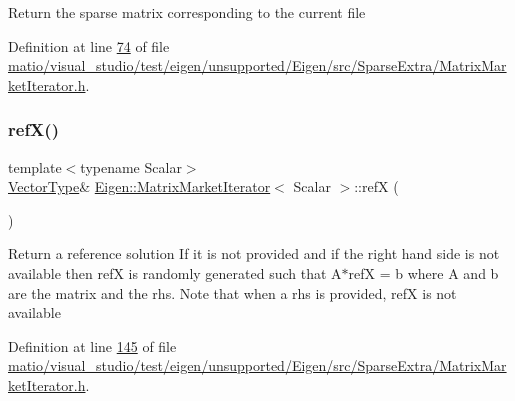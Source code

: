Return the sparse matrix corresponding to the current file 

Definition at line \hyperlink{matio_2visual__studio_2test_2eigen_2unsupported_2_eigen_2src_2_sparse_extra_2_matrix_market_iterator_8h_source_l00074}{74} of file \hyperlink{matio_2visual__studio_2test_2eigen_2unsupported_2_eigen_2src_2_sparse_extra_2_matrix_market_iterator_8h_source}{matio/visual\+\_\+studio/test/eigen/unsupported/\+Eigen/src/\+Sparse\+Extra/\+Matrix\+Market\+Iterator.\+h}.

\mbox{\label{class_eigen_1_1_matrix_market_iterator_a80f334d9fbbed0d24ba0c32d2bea16bc}} 
\subsubsection{\texorpdfstring{ref\+X()}{refX()}\hspace{0.1cm}{\footnotesize\ttfamily [1/2]}}
{\footnotesize\ttfamily template$<$typename Scalar$>$ \\
\hyperlink{group___core___module}{Vector\+Type}\& \hyperlink{class_eigen_1_1_matrix_market_iterator}{Eigen\+::\+Matrix\+Market\+Iterator}$<$ Scalar $>$\+::refX (\begin{DoxyParamCaption}{ }\end{DoxyParamCaption})\hspace{0.3cm}{\ttfamily [inline]}}

Return a reference solution If it is not provided and if the right hand side is not available then refX is randomly generated such that A$\ast$refX = b where A and b are the matrix and the rhs. Note that when a rhs is provided, refX is not available 

Definition at line \hyperlink{matio_2visual__studio_2test_2eigen_2unsupported_2_eigen_2src_2_sparse_extra_2_matrix_market_iterator_8h_source_l00145}{145} of file \hyperlink{matio_2visual__studio_2test_2eigen_2unsupported_2_eigen_2src_2_sparse_extra_2_matrix_market_iterator_8h_source}{matio/visual\+\_\+studio/test/eigen/unsupported/\+Eigen/src/\+Sparse\+Extra/\+Matrix\+Market\+Iterator.\+h}.

\mbox{\label{class_eigen_1_1_matrix_market_iterator_a80f334d9fbbed0d24ba0c32d2bea16bc}} 
